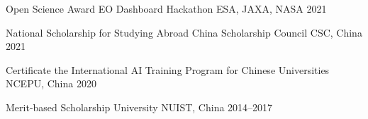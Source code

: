 

\begin{cvhonors}

  \cvhonor
    {Open Science Award} %
    {EO Dashboard Hackathon} %
    {ESA, JAXA, NASA} %
    {2021} %

  \cvhonor
    {National Scholarship for Studying Abroad} %
    {China Scholarship Council} %
    {CSC, China} %
    {2021} %


  \cvhonor
    {Certificate} %
    {the International AI Training Program for Chinese Universities} %
    {NCEPU, China} %
    {2020} %


  \cvhonor
    {Merit-based Scholarship} %
    {University} %
    {NUIST, China} %
    {2014--2017} %

\end{cvhonors}
